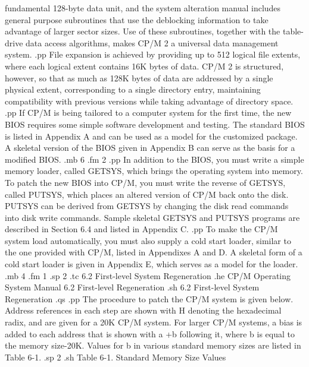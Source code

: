 fundamental 128-byte data unit, and the system alteration manual 
includes general purpose subroutines that use the deblocking 
information to take advantage of larger sector sizes.  Use of 
these subroutines, together with the table-drive data access 
algorithms, makes CP/M 2 a universal data management system.
.pp
File expansion is achieved by providing up to 512 logical file 
extents, where each logical extent contains 16K bytes of data.  
CP/M 2 is structured, however, so that as much as 128K bytes of 
data are addressed by a single physical extent, corresponding to a 
single directory entry, maintaining compatibility with previous 
versions while taking advantage of directory space.
.pp
If CP/M is being tailored to a computer system for the first 
time, the new BIOS requires some simple software development and 
testing.  The standard BIOS is listed in Appendix A and can be 
used as a model for the customized package.  A skeletal version 
of the BIOS given in Appendix B can serve as the basis for a 
modified BIOS.
.mb 6
.fm 2
.pp
In addition to the BIOS, you must write a simple memory 
loader, called GETSYS, which brings the operating system into 
memory.  To patch the new BIOS into CP/M, you must write the 
reverse of GETSYS, called PUTSYS, which places an altered version 
of CP/M back onto the disk.  PUTSYS can be derived from GETSYS by 
changing the disk read commands into disk write commands.  Sample 
skeletal GETSYS and PUTSYS programs are described in Section 6.4 
and listed in Appendix C.
.pp
To make the CP/M system load automatically, you must also 
supply a cold start loader, similar to the one provided with 
CP/M, listed in Appendixes A and D.  A skeletal form of a cold 
start loader is given in Appendix E, which serves as a model for 
the loader.
.mb 4
.fm 1
.sp 2
.tc    6.2  First-level System Regeneration
.he CP/M Operating System Manual        6.2  First-level Regeneration
.sh
6.2  First-level System Regeneration
.qs
.pp
The procedure to patch the CP/M system is given below.  Address 
references in each step are shown with H denoting the 
hexadecimal radix, and are given for a 20K CP/M system.  For 
larger CP/M systems, a bias is added to each address that is 
shown with a +b following it, where b is equal to the memory 
size-20K.  Values for b in various standard memory sizes are listed in
Table 6-1.
.sp 2
.sh
             Table 6-1.  Standard Memory Size Values

